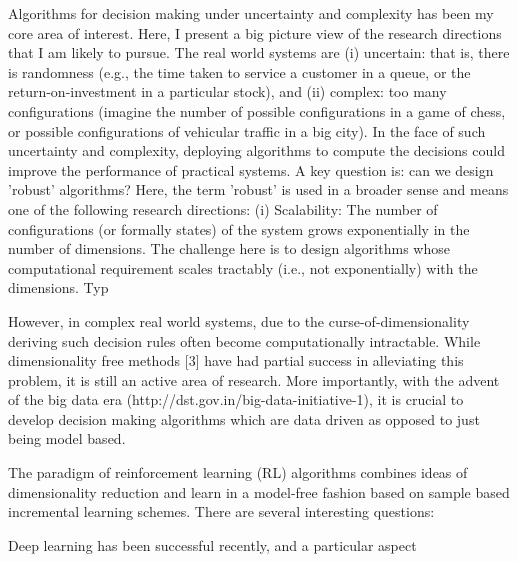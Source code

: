 Algorithms for  decision making under uncertainty and complexity has been my core area of interest. Here, I present a big picture view of the research directions that I am likely to pursue. The real world systems are (i) uncertain: that is, there is randomness (e.g., the time taken to service a customer in a queue, or the return-on-investment in a particular stock), and (ii) complex: too many configurations (imagine the number of possible configurations in a game of chess, or possible configurations of vehicular traffic in a big city). In the face of such uncertainty and complexity, deploying algorithms to compute the decisions could improve the performance of practical systems. A key question is: can we design 'robust' algorithms? Here, the term 'robust' is used in a broader sense and means one of the following research directions:
(i) Scalability: The number of configurations (or formally states) of the system grows exponentially in the number of dimensions. The challenge here is to design algorithms whose computational requirement scales tractably (i.e., not exponentially) with the dimensions. Typ

 However, in complex real world systems, due to the curse-of-dimensionality deriving such decision rules often become computationally intractable. While dimensionality free methods [3] have had partial success in alleviating this problem, it is still an active area of research. More importantly, with the advent of the big data era (http://dst.gov.in/big-data-initiative-1), it is crucial to develop decision making algorithms which are data driven as opposed to just being model based.  
	
	
	

	The paradigm of reinforcement learning (RL) algorithms combines ideas of dimensionality reduction and learn in a model-free fashion based on sample based incremental learning schemes. There are several interesting questions: 
	
 	Deep learning has been successful recently, and a particular aspect 
	

